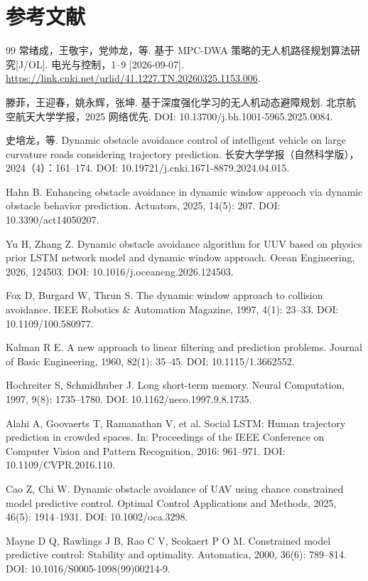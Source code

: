 \documentclass[10pt,a4paper,twocolumn]{ctexart}
\begin{document}
\section*{参考文献}
\begin{thebibliography}{99}
 常绪成，王敬宇，党帅龙，等. 基于 MPC-DWA 策略的无人机路径规划算法研究[J/OL]. 电光与控制，1–9 [2026-09-07]. \url{https://link.cnki.net/urlid/41.1227.TN.20260325.1153.006}.

 滕菲，王迎春，姚永辉，张坤. 基于深度强化学习的无人机动态避障规划. 北京航空航天大学学报，2025 网络优先. DOI: 10.13700/j.bh.1001-5965.2025.0084.

 史培龙，等. Dynamic obstacle avoidance control of intelligent vehicle on large curvature roads considering trajectory prediction. 长安大学学报（自然科学版），2024（4）：161–174. DOI: 10.19721/j.cnki.1671-8879.2024.04.015.

 Hahn B. Enhancing obstacle avoidance in dynamic window approach via dynamic obstacle behavior prediction. Actuators, 2025, 14(5): 207. DOI: 10.3390/act14050207.

 Yu H, Zhang Z. Dynamic obstacle avoidance algorithm for UUV based on physics prior LSTM network model and dynamic window approach. Ocean Engineering, 2026, 124503. DOI: 10.1016/j.oceaneng.2026.124503.

 Fox D, Burgard W, Thrun S. The dynamic window approach to collision avoidance. IEEE Robotics \& Automation Magazine, 1997, 4(1): 23–33. DOI: 10.1109/100.580977.

 Kalman R E. A new approach to linear filtering and prediction problems. Journal of Basic Engineering, 1960, 82(1): 35–45. DOI: 10.1115/1.3662552.

 Hochreiter S, Schmidhuber J. Long short-term memory. Neural Computation, 1997, 9(8): 1735–1780. DOI: 10.1162/neco.1997.9.8.1735.

 Alahi A, Goovaerts T, Ramanathan V, et al. Social LSTM: Human trajectory prediction in crowded spaces. In: Proceedings of the IEEE Conference on Computer Vision and Pattern Recognition, 2016: 961–971. DOI: 10.1109/CVPR.2016.110.

 Cao Z, Chi W. Dynamic obstacle avoidance of UAV using chance constrained model predictive control. Optimal Control Applications and Methods, 2025, 46(5): 1914–1931. DOI: 10.1002/oca.3298.

 Mayne D Q, Rawlings J B, Rao C V, Scokaert P O M. Constrained model predictive control: Stability and optimality. Automatica, 2000, 36(6): 789–814. DOI: 10.1016/S0005-1098(99)00214-9.


\end{thebibliography}
\end{document}
